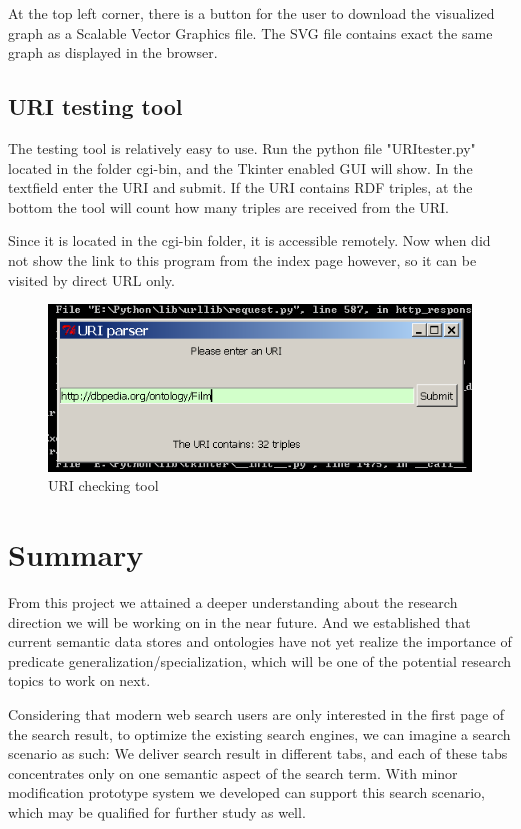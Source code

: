 \documentclass[12pt]{cls}
\begin{document}
At the top left corner, there is a button for the user to download the visualized graph as a Scalable Vector Graphics file. The SVG file contains exact the same graph as displayed in the browser.

\section{URI testing tool}

The testing tool is relatively easy to use. Run the python file "URItester.py" located in the folder cgi-bin, and the Tkinter enabled GUI will show. In the textfield enter the URI and submit. If the URI contains RDF triples, at the bottom the tool will count how many triples are received from the URI.

Since it is located in the cgi-bin folder, it is accessible remotely. Now when did not show the link to this program from the index page however, so it can be visited by direct URL only.

\begin{figure}[H]
\centering
\includegraphics[width=\textwidth]{figures/page4.png}
\caption{URI checking tool}
\label{URI checking tool}
\end{figure}

\chapter{Summary}

From this project we attained a deeper understanding about the research direction we will be working on in the near future. And we established that current semantic data stores and ontologies have not yet realize the importance of predicate generalization/specialization, which will be one of the potential research topics to work on next.

Considering that modern web search users are only interested in the first page of the search result, to optimize the existing search engines, we can imagine a search scenario as such: We deliver search result in different tabs, and each of these tabs concentrates only on one semantic aspect of the search term. With minor modification prototype system we developed can support this search scenario, which may be qualified for further study as well.
\end{document}

